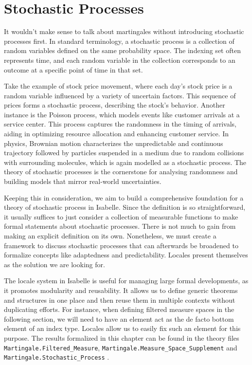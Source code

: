 ﻿%

\chapter{Stochastic Processes}\label{chapter:stochastic_processes}

It wouldn't make sense to talk about martingales without introducing stochastic processes first. In standard terminology, a stochastic process is a collection of random variables defined on the same probability space. The indexing set often represents time, and each random variable in the collection corresponds to an outcome at a specific point of time in that set.

Take the example of stock price movement, where each day's stock price is a random variable influenced by a variety of uncertain factors. This sequence of prices forms a stochastic process, describing the stock's behavior. Another instance is the Poisson process, which models events like customer arrivals at a service center. This process captures the randomness in the timing of arrivals, aiding in optimizing resource allocation and enhancing customer service. In physics, Brownian motion characterizes the unpredictable and continuous trajectory followed by particles suspended in a medium due to random collisions with surrounding molecules, which is again modelled as a stochastic process. The theory of stochastic processes is the cornerstone for analysing randomness and building models that mirror real-world uncertainties.

Keeping this in consideration, we aim to build a comprehensive foundation for a theory of stochastic process in Isabelle. Since the definition is so straightforward, it usually suffices to just consider a collection of measurable functions to make formal statements about stochastic processes. There is not much to gain from making an explicit definition on its own. Nonetheless, we must create a framework to discuss stochastic processes that can afterwards be broadened to formalize concepts like adaptedness and predictability. Locales present themselves as the solution we are looking for.

The locale system in Isabelle is useful for managing large formal developments, as it promotes modularity and reusability. It allows us to define generic theorems and structures in one place and then reuse them in multiple contexts without duplicating efforts. For instance, when defining filtered measure spaces in the following section, we will need to have an element act as the de facto bottom element of an index type. Locales allow us to easily fix such an element for this purpose. The results formalized in this chapter can be found in the theory files \texttt{Martingale.Filtered\_Measure}, \texttt{Martingale.Measure\_Space\_Supplement} and \texttt{Martingale.Stochastic\_Process} \cite{Keskin_A_Formalization_of_2023}.
\vspace{2em}\\

